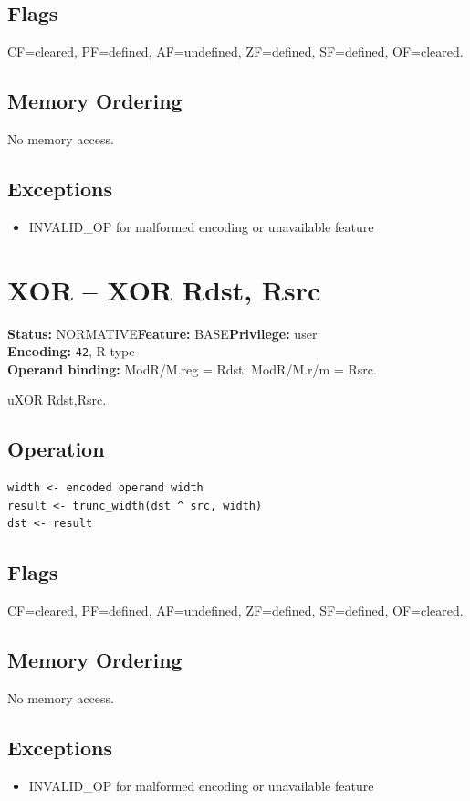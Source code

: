 \documentclass[10pt]{article}
\begin{document}
\subsection*{Flags}
CF=cleared, PF=defined, AF=undefined, ZF=defined, SF=defined, OF=cleared.
\subsection*{Memory Ordering}
No memory access.
\subsection*{Exceptions}
\begin{itemize}
\item INVALID\_OP for malformed encoding or unavailable feature
\end{itemize}
\clearpage

\section{XOR -- XOR Rdst, Rsrc}
\textbf{Status:} NORMATIVE\quad \textbf{Feature:} BASE\quad \textbf{Privilege:} user\\
\textbf{Encoding:} \texttt{42}, R-type\\
\textbf{Operand binding:} ModR/M.reg = Rdst; ModR/M.r/m = Rsrc.

uXOR Rdst,Rsrc.

\subsection*{Operation}
\begin{lstlisting}
width <- encoded operand width
result <- trunc_width(dst ^ src, width)
dst <- result
\end{lstlisting}
\subsection*{Flags}
CF=cleared, PF=defined, AF=undefined, ZF=defined, SF=defined, OF=cleared.
\subsection*{Memory Ordering}
No memory access.
\subsection*{Exceptions}
\begin{itemize}
\item INVALID\_OP for malformed encoding or unavailable feature
\end{itemize}
\clearpage
\end{document}
